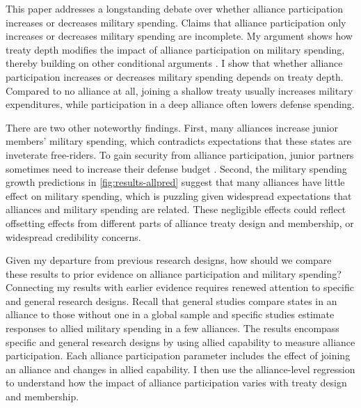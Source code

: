 \documentclass[12pt]{article}
\begin{document}
This paper addresses a longstanding debate over whether alliance participation increases or decreases military spending. 
Claims that alliance participation only increases or decreases military spending are incomplete. 
My argument shows how treaty depth modifies the impact of alliance participation on military spending, thereby building on other conditional arguments \citep{DigiuseppePoast2018}. 
I show that whether alliance participation increases or decreases military spending depends on treaty depth. 
Compared to no alliance at all, joining a shallow treaty usually increases military expenditures, while participation in a deep alliance often lowers defense spending. 


There are two other noteworthy findings.  
First, many alliances increase junior members' military spending, which contradicts expectations that these states are inveterate free-riders. 
To gain security from alliance participation, junior partners sometimes need to increase their defense budget \citep{Horowitzetal2017}. 
Second, the military spending growth predictions in \autoref{fig:results-allpred} suggest that many alliances have little effect on military spending, which is puzzling given widespread expectations that alliances and military spending are related. 
These negligible effects could reflect offsetting effects from different parts of alliance treaty design and membership, or widespread credibility concerns. 


Given my departure from previous research designs, how should we compare these results to prior evidence on alliance participation and military spending? 
Connecting my results with earlier evidence requires renewed attention to specific and general research designs. 
Recall that general studies compare states in an alliance to those without one in a global sample and specific studies estimate responses to allied military spending in a few alliances. 
The results encompass specific and general research designs by using allied capability to measure alliance participation. 
Each alliance participation parameter includes the effect of joining an alliance and changes in allied capability. 
I then use the alliance-level regression to understand how the impact of alliance participation varies with treaty design and membership.   
\end{document}
